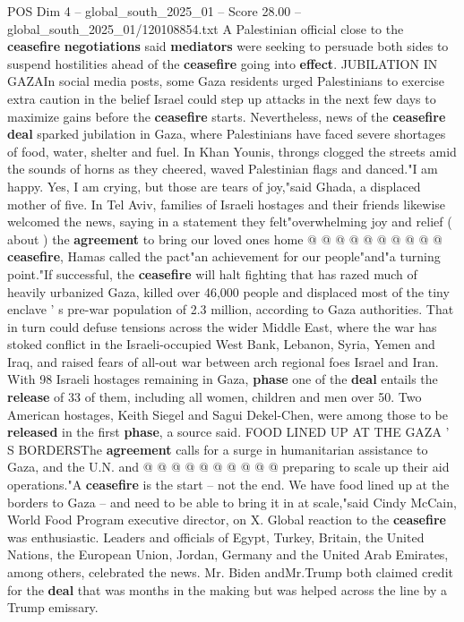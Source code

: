 \begin{textsample}{POS Dim 4 – global\_south\_2025\_01 – Score 28.00 – global\_south\_2025\_01/120108854.txt}
A Palestinian official close to the \textbf{ceasefire} \textbf{negotiations} said \textbf{mediators} were seeking to persuade both sides to suspend hostilities ahead of the \textbf{ceasefire} going into \textbf{effect}.
JUBILATION IN GAZAIn social media posts, some Gaza residents urged Palestinians to exercise extra caution in the belief Israel could step up attacks in the next few days to maximize gains before the \textbf{ceasefire} starts.
Nevertheless, news of the \textbf{ceasefire} \textbf{deal} sparked jubilation in Gaza, where Palestinians have faced severe shortages of food, water, shelter and fuel.
In Khan Younis, throngs clogged the streets amid the sounds of horns as they cheered, waved Palestinian flags and danced."I am happy.
Yes, I am crying, but those are tears of joy,"said Ghada, a displaced mother of five.
In Tel Aviv, families of Israeli hostages and their friends likewise welcomed the news, saying in a statement they felt"overwhelming joy and relief ( about ) the \textbf{agreement} to bring our loved ones home @ @ @ @ @ @ @ @ @ @ \textbf{ceasefire}, Hamas called the pact"an achievement for our people"and"a turning point."If successful, the \textbf{ceasefire} will halt fighting that has razed much of heavily urbanized Gaza, killed over 46,000 people and displaced most of the tiny enclave ' s pre-war population of 2.3 million, according to Gaza authorities.
That in turn could defuse tensions across the wider Middle East, where the war has stoked conflict in the Israeli-occupied West Bank, Lebanon, Syria, Yemen and Iraq, and raised fears of all-out war between arch regional foes Israel and Iran.
With 98 Israeli hostages remaining in Gaza, \textbf{phase} one of the \textbf{deal} entails the \textbf{release} of 33 of them, including all women, children and men over 50.
Two American hostages, Keith Siegel and Sagui Dekel-Chen, were among those to be \textbf{released} in the first \textbf{phase}, a source said.
FOOD LINED UP AT THE GAZA ' S BORDERSThe \textbf{agreement} calls for a surge in humanitarian assistance to Gaza, and the U.N. and @ @ @ @ @ @ @ @ @ @ preparing to scale up their aid operations."A \textbf{ceasefire} is the start -- not the end.
We have food lined up at the borders to Gaza -- and need to be able to bring it in at scale,"said Cindy McCain, World Food Program executive director, on X.
Global reaction to the \textbf{ceasefire} was enthusiastic.
Leaders and officials of Egypt, Turkey, Britain, the United Nations, the European Union, Jordan, Germany and the United Arab Emirates, among others, celebrated the news.
Mr.
Biden andMr.Trump both claimed credit for the \textbf{deal} that was months in the making but was helped across the line by a Trump emissary.

\end{textsample}
